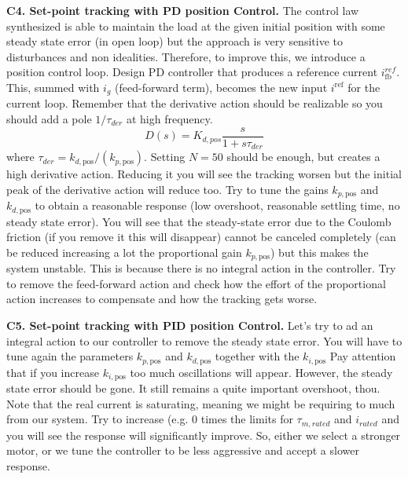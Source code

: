 \documentclass[11pt]{article}
\begin{document}
\par
\textbf{C4. Set-point tracking with PD position Control. } 
The control law synthesized is able to maintain the 
load at the given initial position with some steady state error (in open loop) 
but the approach is very sensitive to disturbances and non idealities. 
Therefore, to improve this, we introduce a position  control loop.
Design  PD controller that produces a reference current $i^{ref}_{\mathrm{fb}}$. 
This, summed with $i_g$ (feed-forward term), becomes the new input $i^\mathrm{ref}$ for the current loop.
Remember that the derivative action should be realizable so you should add a pole $1/\tau_{der}$ at high frequency.
\begin{equation}
D(s)  = K_{d,pos} \frac{s}{1 + s \tau_{der}}
\end{equation}
where  $\tau_{der} = k_{d,\mathrm{pos}}/(k_{p, \mathrm{pos}})$. Setting $N = 50$ should be enough, 
but creates a high derivative action. Reducing it you will 
see the tracking worsen but the initial peak of the derivative action will reduce too.
Try to tune the gains $k_{p, \mathrm{pos}}$ and $k_{d, \mathrm{pos}}$  to obtain a reasonable response (low overshoot, reasonable settling time, no steady state error).
You will see that the steady-state error due to the 
Coulomb friction (if you remove it this will disappear) cannot be canceled completely (can be reduced increasing a lot the proportional 
gain $k_{p, \mathrm{pos}}$) but this makes the system unstable.
This is because there is no integral action in the controller. 
Try to remove the feed-forward action and check how the effort of the proportional action increases to compensate 
and how the tracking gets worse. 



\textbf{C5. Set-point tracking with PID position Control. }
Let's try to ad an integral action to our controller to remove the steady state error. 
You will have to tune again the parameters $k_{p, \mathrm{pos}}$ and $k_{d, \mathrm{pos}}$ together with the $k_{i, \mathrm{pos}}$
Pay attention that if you increase  $k_{i, \mathrm{pos}}$ too much oscillations will appear. 
However, the steady state error should be gone. It still remains a quite important overshoot, thou.
Note that the real current is saturating, meaning we might be requiring to much from our system.
Try to increase (e.g. 0 times the limits for $\tau_{m,rated}$ and $i_{rated}$ 
and you will see the response will significantly  improve. So, either we select a stronger motor, or we 
tune the controller to be less aggressive and accept a slower response.
\end{document}
